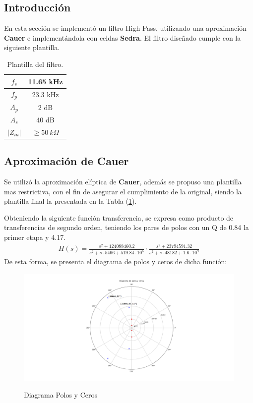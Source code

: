 \subsection{Introducción}

En esta sección se implementó un filtro High-Pass, utilizando una aproximación \textbf{Cauer} e implementándola con celdas \textbf{Sedra}. El filtro diseñado cumple con la siguiente plantilla.
\begin{table}[H]
\centering
\begin{tabular}{|c|c|}
\hline
$f_s$      & 11.65 kHz          \\ \hline
$f_p$      & 23.3 kHz           \\ \hline
$A_p$      & 2 dB               \\ \hline
$A_s$      & 40 dB              \\ \hline
$|Z_{in}|$ & $\geq 50 \ k \Omega$ \\ \hline
\end{tabular}
\caption{Plantilla del filtro.}
\label{tab:plantilla}
\end{table}
\subsection{Aproximación de Cauer}
Se utilizó la aproximación elíptica de \textbf{Cauer}, además se propuso una plantilla mas restrictiva, con el fin de asegurar el cumplimiento de la original, siendo la plantilla final la presentada en la Tabla (\ref{tab:plantilla}).

Obteniendo la siguiente función transferencia, se expresa como producto de transferencias de segundo orden, teniendo los pares de polos con un Q de 0.84 la primer etapa y 4.17.
\begin{align}
	H(s)=\frac{ {s}^{2}+ 124088460.2 
 }{s^2+s\cdot 5466 + 519.84\cdot 10^6 } \cdot \frac{  {s}^{2}+
 23794591.32 }{s^2+s\cdot 48182 + 1.6\cdot 10^9 }
\label{eq:trans}
\end{align}
De esta forma, se presenta el diagrama de polos y ceros de dicha función:
\begin{figure}[H]
	\centering
	\includegraphics[width=\textwidth]{Imagenes-Ej3/DiagramaPolosYCeros.png}
	\label{fig:poleZeroDiag}
	\caption{Diagrama Polos y Ceros}
\end{figure}


